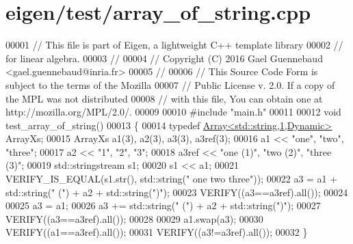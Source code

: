 \hypertarget{eigen_2test_2array__of__string_8cpp_source}{}\section{eigen/test/array\+\_\+of\+\_\+string.cpp}
\label{eigen_2test_2array__of__string_8cpp_source}

\begin{DoxyCode}
00001 \textcolor{comment}{// This file is part of Eigen, a lightweight C++ template library}
00002 \textcolor{comment}{// for linear algebra.}
00003 \textcolor{comment}{//}
00004 \textcolor{comment}{// Copyright (C) 2016 Gael Guennebaud <gael.guennebaud@inria.fr>}
00005 \textcolor{comment}{//}
00006 \textcolor{comment}{// This Source Code Form is subject to the terms of the Mozilla}
00007 \textcolor{comment}{// Public License v. 2.0. If a copy of the MPL was not distributed}
00008 \textcolor{comment}{// with this file, You can obtain one at http://mozilla.org/MPL/2.0/.}
00009 
00010 \textcolor{preprocessor}{#include "main.h"}
00011 
00012 \textcolor{keywordtype}{void} test\_array\_of\_string()
00013 \{
00014   \textcolor{keyword}{typedef} \hyperlink{group___core___module_class_eigen_1_1_array}{Array<std::string,1,Dynamic>} ArrayXs;
00015   ArrayXs a1(3), a2(3), a3(3), a3ref(3);
00016   a1 << \textcolor{stringliteral}{"one"}, \textcolor{stringliteral}{"two"}, \textcolor{stringliteral}{"three"};
00017   a2 << \textcolor{stringliteral}{"1"}, \textcolor{stringliteral}{"2"}, \textcolor{stringliteral}{"3"};
00018   a3ref << \textcolor{stringliteral}{"one (1)"}, \textcolor{stringliteral}{"two (2)"}, \textcolor{stringliteral}{"three (3)"};
00019   std::stringstream s1;
00020   s1 << a1;
00021   VERIFY\_IS\_EQUAL(s1.str(), std::string(\textcolor{stringliteral}{"  one    two  three"}));
00022   a3 = a1 + std::string(\textcolor{stringliteral}{" ("}) + a2 + std::string(\textcolor{stringliteral}{")"});
00023   VERIFY((a3==a3ref).all());
00024 
00025   a3 = a1;
00026   a3 += std::string(\textcolor{stringliteral}{" ("}) + a2 + std::string(\textcolor{stringliteral}{")"});
00027   VERIFY((a3==a3ref).all());
00028 
00029   a1.swap(a3);
00030   VERIFY((a1==a3ref).all());
00031   VERIFY((a3!=a3ref).all());
00032 \}
\end{DoxyCode}
